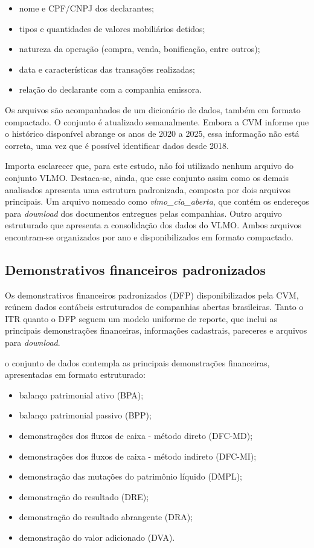 \begin{itemize}
	\item nome e CPF/CNPJ dos declarantes;
	\item tipos e quantidades de valores mobiliários detidos;
	\item natureza da operação (compra, venda, bonificação, entre outros);
	\item data e características das transações realizadas;
	\item relação do declarante com a companhia emissora.
\end{itemize}

Os arquivos são acompanhados de um dicionário de dados, também em formato compactado. O conjunto é atualizado semanalmente. Embora a CVM informe que o histórico disponível abrange os anos de 2020 a 2025, essa informação não está correta, uma vez que é possível identificar dados desde 2018.

Importa esclarecer que, para este estudo, não foi utilizado nenhum arquivo do conjunto VLMO. Destaca-se, ainda, que esse conjunto assim como os demais analisados apresenta uma estrutura padronizada, composta por dois arquivos principais. Um arquivo nomeado como \textit{vlmo\_cia\_aberta}, que contém os endereços para \textit{download} dos documentos entregues pelas companhias. Outro arquivo estruturado que apresenta a consolidação dos dados do VLMO. Ambos arquivos encontram-se organizados por ano e disponibilizados em formato compactado.

\subsection{Demonstrativos financeiros padronizados}
Os demonstrativos financeiros padronizados (DFP) disponibilizados pela CVM, reúnem dados contábeis estruturados de companhias abertas brasileiras. Tanto o ITR quanto o DFP seguem um modelo uniforme de reporte, que inclui as principais demonstrações financeiras, informações cadastrais, pareceres e arquivos para \textit{download}.

o conjunto de dados contempla as principais demonstrações financeiras, apresentadas em formato estruturado:

\begin{itemize}
	\item balanço patrimonial ativo (BPA);
	\item balanço patrimonial passivo (BPP);
	\item demonstrações dos fluxos de caixa - método direto (DFC-MD);
	\item demonstrações dos fluxos de caixa - método indireto (DFC-MI);
	\item demonstração das mutações do patrimônio líquido (DMPL);
	\item demonstração do resultado (DRE);
	\item demonstração do resultado abrangente (DRA);
	\item demonstração do valor adicionado (DVA).
\end{itemize}

